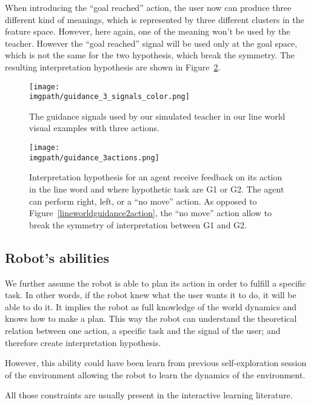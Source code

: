 When introducing the ``goal reached'' action, the user now can produce three different kind of meanings, which is represented by three different clusters in the feature space. However, here again, one of the meaning won't be used by the teacher. However the ``goal reached'' signal will be used only at the goal space, which is not the same for the two hypothesis, which break the symmetry. The resulting interpretation hypothesis are shown in Figure~\ref{fig:lineworldguidance3action}.

\begin{figure}[!ht]
  \centering
  \texttt{[image: \\imgpath/guidance\_3\_signals\_color.png]}
  \caption{The guidance signals used by our simulated teacher in our line world visual examples with three actions.}
  \label{fig:lineworldguidance3signals}
\end{figure}

\begin{figure}[!ht]
  \centering
  \texttt{[image: \\imgpath/guidance\_3actions.png]}
  \caption{Interpretation hypothesis for an agent receive feedback on its action in the line word and where hypothetic task are G1 or G2. The agent can perform right, left, or a ``no move'' action. As opposed to Figure~\ref{lineworldguidance2action}, the ``no move'' action allow to break the symmetry of interpretation between G1 and G2.}
  \label{fig:lineworldguidance3action}
\end{figure}

\subsection{Robot's abilities}

We further assume the robot is able to plan its action in order to fulfill a specific task. In other words, if the robot knew what the user wants it to do, it will be able to do it. It implies the robot as full knowledge of the world dynamics and knows how to make a plan. This way the robot can understand the theoretical relation between one action, a specific task and the signal of the user; and therefore create interpretation hypothesis.

However, this ability could have been learn from previous self-exploration session of the environment allowing the robot to learn the dynamics of the environment.

\transition

All those constraints are usually present in the interactive learning literature. 

